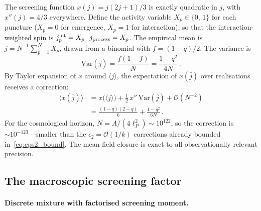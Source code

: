 \documentclass[aps,prd,twocolumn,10pt,superscriptaddress,nofootinbib]{revtex4-2}
\begin{document}
The screening function $x(j) = j(2j+1)/3$ is exactly quadratic in
$j$, with $x''(j) = 4/3$ everywhere.  Define the activity variable
$X_p \in \{0,\,1\}$ for each puncture ($X_p = 0$ for emergence,
$X_p = 1$ for interaction), so that the interaction-weighted spin
is $j_p^{\rm int} = X_p \cdot j_{\rm process} = X_p$.  The
empirical mean is
$\bar{j} = N^{-1}\sum_{p=1}^{N} X_p$, drawn from a binomial
with $f = (1-q)/2$.  The variance is
\begin{equation}
\mathrm{Var}(\bar{j})
  = \frac{f(1-f)}{N}
  = \frac{1-q^2}{4N}\,.
\label{eq:var_jbar}
\end{equation}
By Taylor expansion of $x$ around $\langle j \rangle$, the
expectation of $x(\bar{j})$ over realisations receives a
correction:
\begin{align}
\langle x(\bar{j}) \rangle
  &= x\bigl(\langle j \rangle\bigr)
    + \tfrac{1}{2}\,x''\,\mathrm{Var}(\bar{j})
    + \mathcal{O}(N^{-2})
\nonumber \\
  &= \frac{(1-q)(2-q)}{6}
    + \frac{1-q^2}{6N}\,.
\label{eq:x_fluctuation}
\end{align}
For the cosmological horizon, $N = A/(4\ell_P^2) \sim 10^{122}$,
so the correction is $\sim 10^{-123}$---smaller than the
$\epsilon_2 = \mathcal{O}(1/k)$ corrections already bounded
in~\eqref{eq:eps2_bound}.  The mean-field closure is exact to all
observationally relevant precision.


\subsection{The macroscopic screening factor}
\label{sec:macroscopic_screening}

\paragraph{Discrete mixture with factorised screening moment.}
\end{document}
